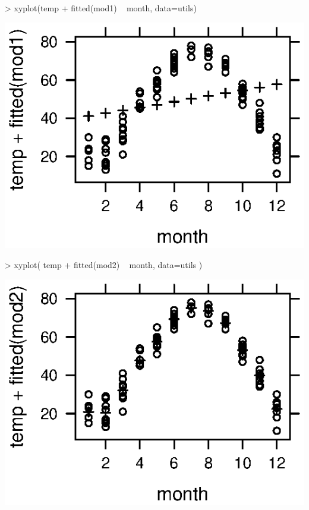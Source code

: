 \begin{description}
\begin{Schunk}
\begin{Sinput}
> xyplot(temp + fitted(mod1) ~ month, data=utils)
\end{Sinput}
\end{Schunk}
\includegraphics{Figures/formulas-util-mod1}

\begin{Schunk}
\begin{Sinput}
> xyplot( temp + fitted(mod2) ~ month, data=utils )
\end{Sinput}
\end{Schunk}
\includegraphics{Figures/formulas-util-mod2}




\end{description}
